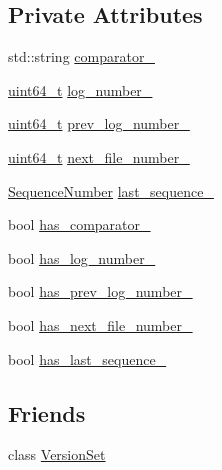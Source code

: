 \subsection*{Private Attributes}
\begin{DoxyCompactItemize}
\item 
std\+::string \hyperlink{classleveldb_1_1_version_edit_abc12f1138eab74643342b6a5de10521c}{comparator\+\_\+}
\item 
\hyperlink{stdint_8h_aaa5d1cd013383c889537491c3cfd9aad}{uint64\+\_\+t} \hyperlink{classleveldb_1_1_version_edit_a526b91059db8175f1f4f56d00a5bf4d4}{log\+\_\+number\+\_\+}
\item 
\hyperlink{stdint_8h_aaa5d1cd013383c889537491c3cfd9aad}{uint64\+\_\+t} \hyperlink{classleveldb_1_1_version_edit_ac8762934b27315cb0ba897c306412562}{prev\+\_\+log\+\_\+number\+\_\+}
\item 
\hyperlink{stdint_8h_aaa5d1cd013383c889537491c3cfd9aad}{uint64\+\_\+t} \hyperlink{classleveldb_1_1_version_edit_a8da3ef0a05e96034b2cc5d32fd06bccb}{next\+\_\+file\+\_\+number\+\_\+}
\item 
\hyperlink{namespaceleveldb_a5481ededd221c36d652c371249f869fa}{Sequence\+Number} \hyperlink{classleveldb_1_1_version_edit_af7718924a84a2a655a27104070580d09}{last\+\_\+sequence\+\_\+}
\item 
bool \hyperlink{classleveldb_1_1_version_edit_a2363546c6ba6b79162058c9d8d9980af}{has\+\_\+comparator\+\_\+}
\item 
bool \hyperlink{classleveldb_1_1_version_edit_a72cf0203239ea5cfcb231c99ad430df1}{has\+\_\+log\+\_\+number\+\_\+}
\item 
bool \hyperlink{classleveldb_1_1_version_edit_aede87f4a703e74d16890ef4fa96df7fc}{has\+\_\+prev\+\_\+log\+\_\+number\+\_\+}
\item 
bool \hyperlink{classleveldb_1_1_version_edit_a71f032cd98934d100d84363c08f033d8}{has\+\_\+next\+\_\+file\+\_\+number\+\_\+}
\item 
bool \hyperlink{classleveldb_1_1_version_edit_aa7e36bdcdd10c4e17b9bc86281cd7cb8}{has\+\_\+last\+\_\+sequence\+\_\+}
\end{DoxyCompactItemize}
\subsection*{Friends}
\begin{DoxyCompactItemize}
\item 
class \hyperlink{classleveldb_1_1_version_edit_a1827cd1b4d6e9e3c378ce37ca3cce635}{Version\+Set}
\end{DoxyCompactItemize}


